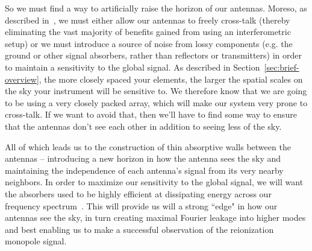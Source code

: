 So we must find a way to artificially raise the horizon of our antennas.  
Moreso, as described in~\citet{venumadhav2016}, we must either allow our 
antennas to freely cross-talk (thereby eliminating the vast majority of 
benefits gained from using an interferometric setup) or we must introduce a 
source of noise from lossy components (e.g. the ground or other signal 
absorbers, rather than reflectors or transmitters) in order to maintain a 
sensitivity to the global signal. As described in 
Section~\ref{sec:brief-overview}, the more closely spaced your elements, the 
larger the spatial scales on the sky your instrument will be sensitive to. We 
therefore know that we are going to be using a very closely packed array, which 
will make our system very prone to cross-talk. If we want to avoid that, then 
we'll have to find some way to ensure that the antennas don't see each other in 
addition to seeing less of the sky.

All of which leads us to the construction of thin absorptive walls between the 
antennas -- introducing a new horizon in how the antenna sees the sky and 
maintaining the independence of each antenna's signal from its very nearby 
neighbors. In order to maximize our sensitivity to the global signal, we will 
want the absorbers used to be highly efficient at dissipating energy across our 
frequency spectrum~\citep{venumadhav2016}. This will provide us will a strong 
``edge" in how our antennas see the sky, in turn creating maximal Fourier 
leakage into higher modes and best enabling us to make a successful observation 
of the reionization monopole signal.
